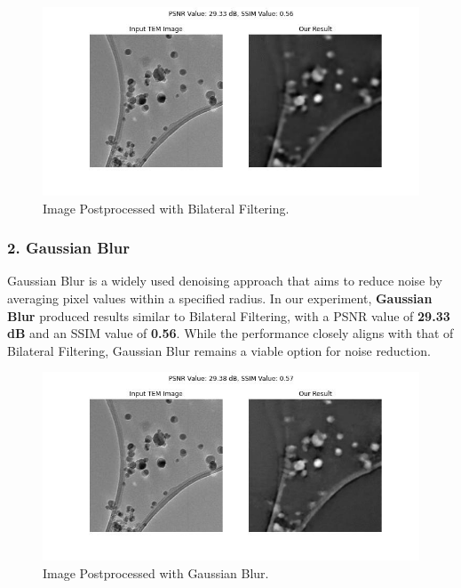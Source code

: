\begin{figure}[H]
\centering
\includegraphics[width=1\textwidth]{img/Dataset_3_with_bilateral_filter.jpg}
\caption{Image Postprocessed with Bilateral Filtering.}\label{fig:Dataset_3_Bilateral_Filtering}
\end{figure}

\subsubsection{2. Gaussian Blur}
Gaussian Blur is a widely used denoising approach that aims to reduce noise by averaging pixel values within a specified radius. In our experiment, \textbf{Gaussian Blur} produced results similar to Bilateral Filtering, with a PSNR value of \textbf{29.33 dB} and an SSIM value of \textbf{0.56}. While the performance closely aligns with that of Bilateral Filtering, Gaussian Blur remains a viable option for noise reduction.

\begin{figure}[H]
\centering
\includegraphics[width=1\textwidth]{img/Dataset_3_with_gaussian_blur.jpg}
\caption{Image Postprocessed with Gaussian Blur.}\label{fig:Dataset_3_Gaussian_Blur}
\end{figure}

